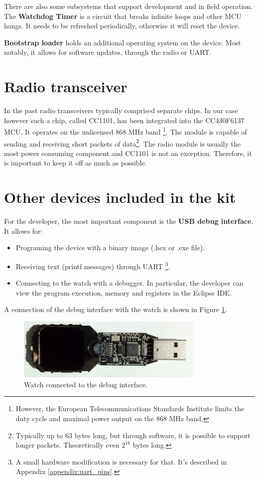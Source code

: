 There are also some subsystems that support development and in field
operation. The {\bf Watchdog Timer} is a circuit that breaks infinite
loops and other MCU hangs. It needs to be refreshed periodically,
otherwise it will reset the device.

{\bf Bootstrap loader} holds an additional operating system on the
device.  Most notably, it allows for software updates, through the
radio or UART.

\section{Radio transceiver}

In the past radio transceivers typically comprised separate chips. In
our case however such a chip, called CC1101, has been integrated into
the CC430F6137 MCU.  It operates on the unlicensed 868 MHz band
\footnote{However, the European Telecommunications Standards Institute
limits the duty cycle and maximal power output on the 868 MHz band.}.
The module is capable of sending and receiving short packets of
data\footnote{Typically up to 63 bytes long, but through software, it
is possible to support longer packets. Theoretically even $2^{16}$
bytes long.}.  The radio module is usually the most power consuming
component and CC1101 is not an exception. Therefore, it is important
to keep it off as much as possible.

\section{Other devices included in the kit}

For the developer, the most important component is the {\bf USB debug
interface}. It allows for:
\begin{itemize}
  \item Programing the device with a binary image (.hex or .exe file).
  \item Receiving text (printf messages) through UART \footnote{A small
    hardware modification is necessary for that. It's described in
    Appendix \ref{appendix:uart_pins}.}.
  \item Connecting to the watch with a debugger. In particular, the
    developer can view the program execution, memory and registers in
    the Eclipse IDE.
\end{itemize}
A connection of the debug interface with the watch is shown in Figure
\ref{fig:chronos_dongle}.

\begin{figure}[h]
  \centering
  \includegraphics[width=0.8\textwidth]{img/chronos_dongle.jpg}
  \caption{Watch connected to the debug interface.}
  \label{fig:chronos_dongle}
\end{figure}

